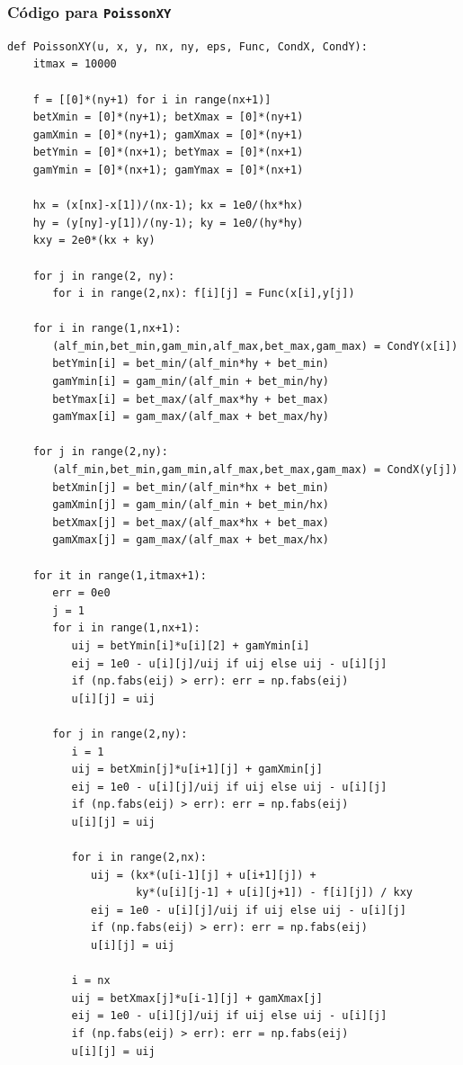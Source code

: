\documentclass[12pt]{beamer}
\begin{document}
\begin{frame}
\frametitle{Código para \texttt{PoissonXY}}
\begin{lstlisting}[caption=Código para la función \texttt{PoissonXY}]
def PoissonXY(u, x, y, nx, ny, eps, Func, CondX, CondY):
    itmax = 10000
 
    f = [[0]*(ny+1) for i in range(nx+1)]
    betXmin = [0]*(ny+1); betXmax = [0]*(ny+1)
    gamXmin = [0]*(ny+1); gamXmax = [0]*(ny+1)
    betYmin = [0]*(nx+1); betYmax = [0]*(nx+1)
    gamYmin = [0]*(nx+1); gamYmax = [0]*(nx+1)
 
    hx = (x[nx]-x[1])/(nx-1); kx = 1e0/(hx*hx)
    hy = (y[ny]-y[1])/(ny-1); ky = 1e0/(hy*hy) 
    kxy = 2e0*(kx + ky)
 
    for j in range(2, ny):
       for i in range(2,nx): f[i][j] = Func(x[i],y[j])
                                                         
    for i in range(1,nx+1):
       (alf_min,bet_min,gam_min,alf_max,bet_max,gam_max) = CondY(x[i])
       betYmin[i] = bet_min/(alf_min*hy + bet_min)
       gamYmin[i] = gam_min/(alf_min + bet_min/hy)
       betYmax[i] = bet_max/(alf_max*hy + bet_max)
       gamYmax[i] = gam_max/(alf_max + bet_max/hy)
 
    for j in range(2,ny):
       (alf_min,bet_min,gam_min,alf_max,bet_max,gam_max) = CondX(y[j])
       betXmin[j] = bet_min/(alf_min*hx + bet_min)
       gamXmin[j] = gam_min/(alf_min + bet_min/hx)
       betXmax[j] = bet_max/(alf_max*hx + bet_max)
       gamXmax[j] = gam_max/(alf_max + bet_max/hx)
 
    for it in range(1,itmax+1): 
       err = 0e0
       j = 1
       for i in range(1,nx+1):
          uij = betYmin[i]*u[i][2] + gamYmin[i]
          eij = 1e0 - u[i][j]/uij if uij else uij - u[i][j]
          if (np.fabs(eij) > err): err = np.fabs(eij)
          u[i][j] = uij
 
       for j in range(2,ny):
          i = 1
          uij = betXmin[j]*u[i+1][j] + gamXmin[j]
          eij = 1e0 - u[i][j]/uij if uij else uij - u[i][j]
          if (np.fabs(eij) > err): err = np.fabs(eij)
          u[i][j] = uij
 
          for i in range(2,nx):
             uij = (kx*(u[i-1][j] + u[i+1][j]) +
                    ky*(u[i][j-1] + u[i][j+1]) - f[i][j]) / kxy
             eij = 1e0 - u[i][j]/uij if uij else uij - u[i][j] 
             if (np.fabs(eij) > err): err = np.fabs(eij)
             u[i][j] = uij
 
          i = nx
          uij = betXmax[j]*u[i-1][j] + gamXmax[j]
          eij = 1e0 - u[i][j]/uij if uij else uij - u[i][j]
          if (np.fabs(eij) > err): err = np.fabs(eij)
          u[i][j] = uij
 

\end{lstlisting}
\end{frame}
\end{document}

